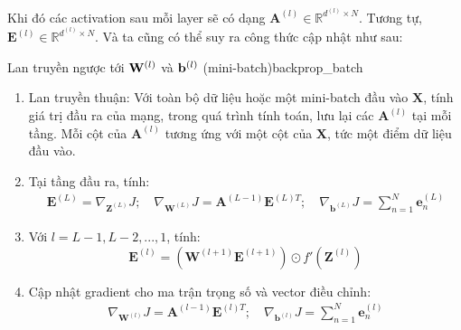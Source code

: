 Khi đó các activation sau mỗi layer sẽ có dạng $\mathbf{A}^{(l)} \in \mathbb{R}^{d^{(l)} \times N}$. Tương tự, $\mathbf{E}^{(l)} \in \mathbb{R}^{d^{(l)}\times N}$. Và ta cũng có thể suy ra công thức cập nhật như sau:

\begin{myalg}{Lan truyền ngược tới $\mathbf{W}^{(l)}$ và $\mathbf{b}^{(l)}$ (mini-batch)}{backprop_batch}
\begin{enumerate}
\item Lan truyền thuận: Với toàn bộ dữ liệu hoặc một mini-batch đầu vào
$\mathbf{X}$, tính giá trị đầu ra của mạng, trong quá trình tính toán, lưu lại
các $\mathbf{A}^{(l)}$ tại mỗi tầng. Mỗi cột của $\mathbf{A}^{(l)}$ tương ứng
với một cột của $\mathbf{X}$, tức một điểm dữ liệu đầu vào.
\item Tại tầng đầu ra, tính:
\begin{eqnarray*}
\mathbf{E}^{(L)} = \nabla_{\mathbf{Z}^{(L)}}J; \quad
\nabla_{\mathbf{W}^{(L)}}J =
\mathbf{A}^{(L-1)}\mathbf{E}^{(L)T}; \quad
\nabla_{\mathbf{b}^{(L)}}J =  \sum_{n=1}^N\mathbf{e}_n^{(L)}
\end{eqnarray*}
\item Với $l = L-1, L-2, ..., 1$, tính:
\begin{equation*}
\mathbf{E}^{(l)} = \left( \mathbf{W}^{(l+1)} \mathbf{E}^{(l+1)} \right) \odot f'(\mathbf{Z}^{(l)})
\end{equation*}

\item Cập nhật gradient cho ma trận trọng số và vector điều chỉnh:
\begin{eqnarray*}
\nabla_{\mathbf{W}^{(l)}}J =
\mathbf{A}^{(l-1)}\mathbf{E}^{(l)T}; \quad
\nabla_{\mathbf{b}^{(l)}}J =  \sum_{n=1}^N\mathbf{e}_n^{(l)}
\end{eqnarray*}
\end{enumerate}
\end{myalg}



